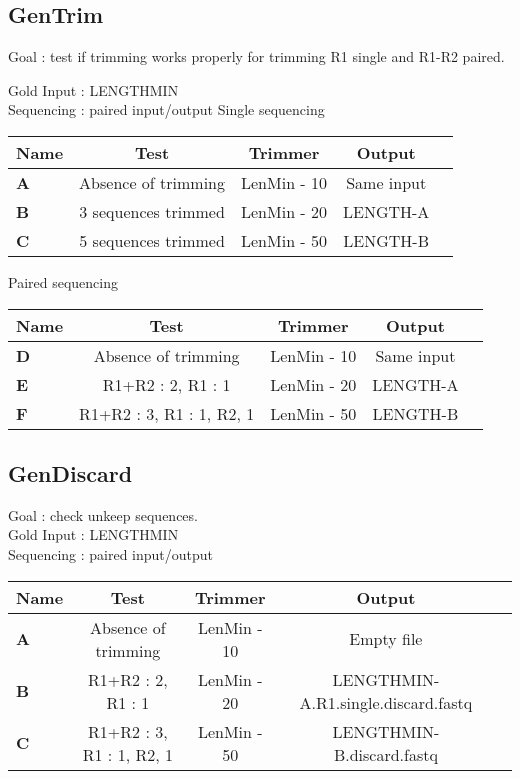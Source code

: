 \documentclass{article}
\begin{document}
\subsection{GenTrim}
Goal : test if trimming works properly for trimming R1 single and R1-R2 paired.\par
Gold Input : LENGTHMIN\\
Sequencing : paired input/output
Single sequencing
\begin{table}[H]
\begin{tabular}{|l|c|c|c|c|} \hline
    \textbf{Name} & \textbf{Test} & \textbf{Trimmer} & \textbf{Output} \\ \hline
    \textbf{A} & Absence of trimming & LenMin - 10 & Same input\\ \hline
    \textbf{B} & 3 sequences trimmed & LenMin - 20 & LENGTH-A\\ \hline
    \textbf{C} & 5 sequences trimmed & LenMin - 50 & LENGTH-B\\ \hline
\end{tabular}
\end{table}
Paired sequencing
\begin{table}[H]
\begin{tabular}{|l|c|c|c|c|} \hline
    \textbf{Name} & \textbf{Test} & \textbf{Trimmer} & \textbf{Output}\\ \hline
    \textbf{D} & Absence of trimming & LenMin - 10 & Same input\\ \hline
    \textbf{E} & R1+R2 : 2, R1 : 1 & LenMin - 20 &  LENGTH-A\\ \hline
    \textbf{F} & R1+R2 : 3, R1 : 1, R2, 1 & LenMin - 50 & LENGTH-B\\ \hline
\end{tabular}
\end{table}

\subsection{GenDiscard}
Goal : check unkeep sequences.\\
Gold Input : LENGTHMIN\\
Sequencing : paired input/output
\begin{table}[H]
\begin{tabular}{|l|c|c|c|c|} \hline
    \textbf{Name} & \textbf{Test} & \textbf{Trimmer} & \textbf{Output} \\ \hline
    \textbf{A} & Absence of trimming & LenMin - 10 & Empty file \\ \hline
    \textbf{B} & R1+R2 : 2, R1 : 1 & LenMin - 20 & LENGTHMIN-A.R1.single.discard.fastq \\ \hline
    \textbf{C} & R1+R2 : 3, R1 : 1, R2, 1 & LenMin - 50 & LENGTHMIN-B.discard.fastq \\ \hline
\end{tabular}
\end{table}
\end{document}

